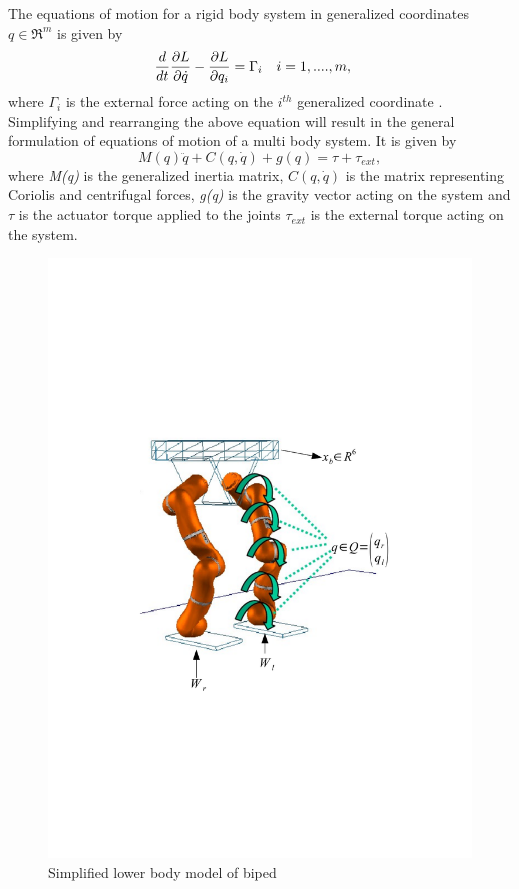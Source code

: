 The equations of motion for a rigid body system in generalized coordinates $q \in \Re^m $ is given by
\begin{align}
\frac{d}{dt} &\frac{\partial {L}}{\partial {\dot{q}}} - \frac{\partial {L}}{\partial {q_i}} = \Gamma_i && i=1,....,m,
\end{align}
where $\Gamma_i$ is the external force acting on the $i^{th}$ generalized coordinate \cite[Chapter 4]{mur94}.
Simplifying and rearranging the above equation will result in the general formulation of equations of motion of a multi body system. It is given by
\begin{equation}
\label{eq:dyn_mul_bdy}
M(q)\ddot{q}+C(q,\dot{q})+g(q) = \tau + \tau_{ext},
\end{equation}
where \emph{M(q)} is the generalized inertia matrix, $C(q,\dot{q})$ is the matrix representing Coriolis and centrifugal forces, \emph{g(q)} is the gravity vector acting on the system and $\tau$ is the actuator torque applied to the joints $\tau_{ext}$ is the external torque acting on the system.
\begin{figure}
\begin{center}
\includegraphics[trim= 10mm 80mm 10mm 80mm,scale=0.75]{Bilder/model_biped.pdf}
\caption{Simplified lower body model of biped}
\label{fig:biped_simplelow}
\end{center}
\end{figure}

